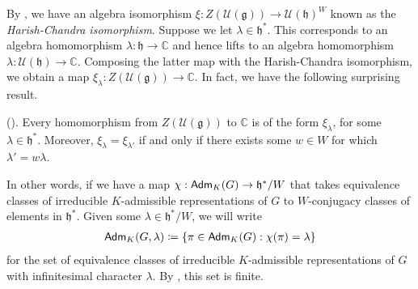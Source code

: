 \noindent By \cite[Theorem 0.2.8]{Vog81}, we have an algebra isomorphism $\xi : Z(\mathcal{U}(\mathfrak{g})) \to \mathcal{U}(\mathfrak{h})^W$ known as the {\em Harish-Chandra isomorphism}. Suppose we let $\lambda \in \mathfrak{h}^*$. This corresponds to an algebra homomorphism $\lambda : \mathfrak{h} \to \mathbb{C}$ and hence lifts to an algebra homomorphism $\lambda : \mathcal{U}(\mathfrak{h}) \to \mathbb{C}$. Composing the latter map with the Harish-Chandra isomorphism, we obtain a map $\xi_\lambda : Z(\mathcal{U}(\mathfrak{g})) \to \mathbb{C}$. In fact, we have the following surprising result.\\
\noindent\begin{theorem}\textup{(\cite[Corollary 0.2.10]{Vog81}).} Every homomorphism from $Z(\mathcal{U}(\mathfrak{g}))$ to $\mathbb{C}$ is of the form $\xi_\lambda$, for some $\lambda \in \mathfrak{h}^*$. Moreover, $\xi_\lambda = \xi_{\lambda'}$ if and only if there exists some $w \in W$ for which $\lambda' = w\lambda$.\\
\end{theorem}

\noindent In other words, if we have a map $\chi : \textup{\textsf{Adm}}_K(G) \to \mathfrak{h}^*/W$ that takes equivalence classes of irreducible $K$-admissible representations of $G$ to $W$-conjugacy classes of elements in $\mathfrak{h}^*$. Given some $\lambda \in \mathfrak{h}^*/W$, we will write
\begin{align*}
\begin{split}
\textup{\textsf{Adm}}_K(G, \lambda) \coloneqq \{\pi \in \textup{\textsf{Adm}}_K(G) : \chi(\pi) = \lambda\}
\end{split}
\end{align*}
\noindent for the set of equivalence classes of irreducible $K$-admissible representations of $G$ with infinitesimal character $\lambda$. By \cite[Corollary 5.4.17]{Vog81}, this set is finite.\\

